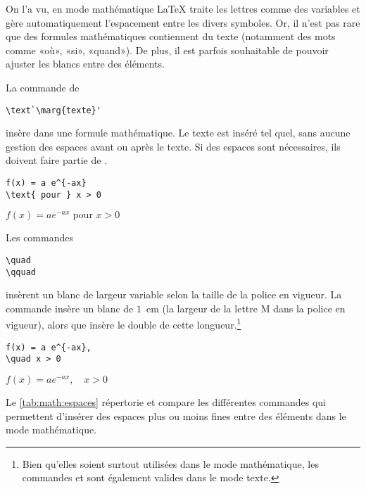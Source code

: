 On l'a vu, en mode mathématique {\LaTeX} traite les lettres comme des
variables et gère automatiquement l'espacement entre les divers
symboles. Or, il n'est pas rare que des formules mathématiques
contiennent du texte (notamment des mots comme «où», «si», «quand»).
De plus, il est parfois souhaitable de pouvoir ajuster les blancs
entre des éléments.

La commande de 
\begin{lstlisting}
\text`\marg{texte}'
\end{lstlisting}
insère  dans une formule mathématique. Le texte est inséré
tel quel, sans aucune gestion des espaces avant ou après le texte. Si
des espaces sont nécessaires, ils doivent faire partie de
.
\begin{demo}
  \begin{texample}
\begin{lstlisting}
f(x) = a e^{-ax}
\text{ pour } x > 0
\end{lstlisting}
    \producing $f(x) = a e^{-ax} \text{ pour } x > 0$
  \end{texample}
\end{demo}

Les commandes
\begin{lstlisting}
\quad
\qquad
\end{lstlisting}
insèrent un blanc de largeur variable selon la taille de la police en
vigueur. La commande \cmd{\quad} insère un blanc de $1$~em (la largeur de
la lettre M dans la police en vigueur), alors que \cmd{\qquad}
insère le double de cette longueur.\footnote{%
  Bien qu'elles soient surtout utilisées dans le mode mathématique,
  les commandes \cmd{\quad} et \cmd{\qquad} sont également valides
  dans le mode texte.}
\begin{demo}
  \begin{texample}
\begin{lstlisting}
f(x) = a e^{-ax},
\quad x > 0
\end{lstlisting}
    \producing
    $f(x) = a e^{-ax}, \quad x > 0$
  \end{texample}
\end{demo}

Le \autoref{tab:math:espaces} répertorie et compare les différentes
commandes qui permettent d'insérer des espaces plus ou moins fines
entre des éléments dans le mode mathématique.


